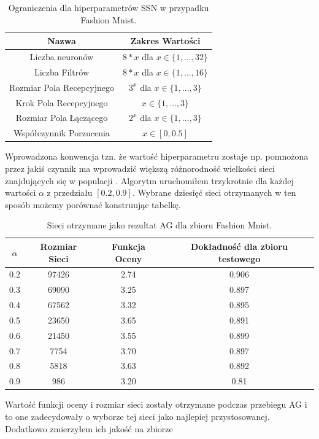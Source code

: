 \documentclass{article}
\begin{document}
\begin{table}[H]
\centering
\begin{tabular}{|c|c|}
	\hline
	Nazwa & Zakres Wartości  \\
	\hline
	Liczba neuronów           & $8*x$ dla $x\in \{1, ...,32\}$\\
	Liczba Filtrów            & $8*x$ dla $x\in \{1, ...,16\}$\\
	Rozmiar Pola Recepcyjnego & $3^x$ dla $x \in \{1, ...,3\}$\\
	Krok Pola Recepcyjnego    & $x \in \{1, ...,3\}$\\
	Rozmiar Pola Łączącego    & $2^x$ dla $x \in \{1, ...,3\}$\\
	Współczynnik Porzucenia   & $x \in [0, 0.5]$\\
	\hline
\end{tabular}
\caption{\label{tab:fm_zakres}Ograniczenia dla hiperparametrów SSN w przypadku Fashion Mnist.}
\end{table}
Wprowadzona konwencja tzn. że wartość hiperparametru zostaje np. pomnożona przez jakiś czynnik
ma wprowadzić większą różnorodność wielkości sieci znajdujących się w populacji 
\cite{ams}.
Algorytm uruchomiłem trzykrotnie dla każdej wartości $\alpha$ z przedziału $[0.2, 0.9]$.
Wybrane dziesięć sieci otrzymanych w ten sposób możemy porównać konstruując tabelkę.
\begin{table}[H]
\centering
\begin{tabular}{|c|c|c|c|}
        \hline
	$\alpha$ & Rozmiar Sieci & Funkcja Oceny & Dokładność dla zbioru testowego\\
	\hline
	0.2 & 97426 & 2.74 & 0.906 \\
	0.3 & 69090 & 3.25  & 0.897 \\
	0.4 & 67562 & 3.32 & 0.895 \\
	0.5 & 23650 & 3.65 & 0.891 \\
	0.6 & 21450 & 3.55 & 0.899 \\
	0.7 & 7754 & 3.70 & 0.897 \\
	0.8 & 5818 &  3.63 & 0.892 \\
	0.9 & 986 & 3.20 & 0.81 \\
	\hline
\end{tabular}
\caption{\label{tab:fmres}Sieci otrzymane  jako rezultat AG dla zbioru Fashion Mnist.}
\end{table}
Wartość funkcji oceny i rozmiar sieci zostały otrzymane podczas przebiegu AG i to one zadecydowały
o wyborze tej sieci jako najlepiej przystosowanej. Dodatkowo zmierzyłem ich jakość na zbiorze 
\end{document}
